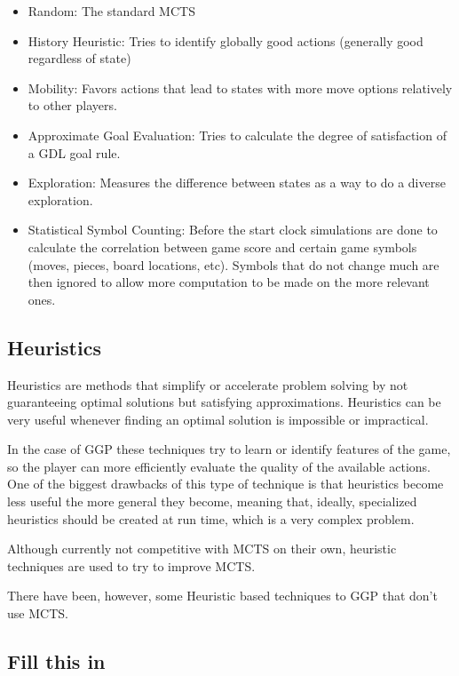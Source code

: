 \begin{itemize}

\item Random: The standard MCTS

\item History Heuristic: Tries to identify globally good actions (generally good regardless of state)

\item Mobility: Favors actions that lead to states with more move options relatively to other players.

\item Approximate Goal Evaluation: Tries to calculate the degree of satisfaction of a GDL goal rule. 

\item Exploration: Measures the difference between states as a way to do a diverse exploration. 

\item Statistical Symbol Counting: Before the start clock simulations are done to calculate the correlation between game score and certain game symbols (moves, pieces, board locations, etc). Symbols that do not change much are then ignored to allow more computation to be made on the more relevant ones.

\end{itemize}

\subsection{Heuristics}
Heuristics are methods that simplify or accelerate problem solving by not guaranteeing optimal solutions but satisfying approximations. Heuristics can be very useful whenever finding an optimal solution is impossible or impractical.

In the case of \gls{GGP} these techniques try to learn or identify features of the game, so the player can more efficiently evaluate the quality of the available actions. One of the biggest drawbacks of this type of technique is that heuristics become less useful the more general they become, meaning that, ideally, specialized heuristics should be created at run time, which is a very complex problem.

Although currently not competitive with \gls{MCTS} on their own, heuristic techniques are used to try to improve \gls{MCTS}.

There have been, however, some Heuristic based techniques to \gls{GGP} that don't use \gls{MCTS}.

\subsection{Fill this in}
